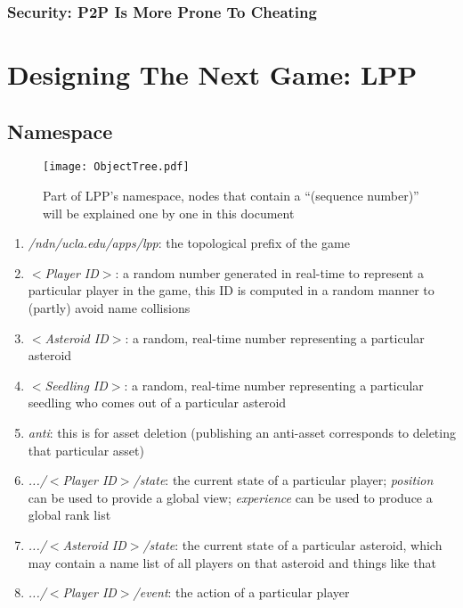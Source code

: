 \documentclass{article}
\begin{document}
\subsubsection{Security: P2P Is More Prone To Cheating}

\section{Designing The Next Game: LPP}
\label{dslpp}

\subsection{Namespace}

\begin{figure}[htbp]
\begin{center}
\texttt{[image: ObjectTree.pdf]}
\caption{Part of LPP's namespace, nodes that contain a ``(sequence number)'' will be explained one by one in this document}
\label{ns}
\end{center}
\end{figure}

\begin{enumerate}
\item \emph{/ndn/ucla.edu/apps/lpp}: the topological prefix of the game
\item \emph{$<$Player ID$>$}: a random number generated in real-time to represent a particular player in the game, this ID is computed in a random manner to (partly) avoid name collisions
\item \emph{$<$Asteroid ID$>$}: a random, real-time number representing a particular asteroid
\item \emph{$<$Seedling ID$>$}: a random, real-time number representing a particular seedling who comes out of a particular asteroid
\item \emph{anti}: this is for asset deletion (publishing an anti-asset corresponds to deleting that particular asset)
\item \emph{.../$<$Player ID$>$/state}: the current state of a particular player; \emph{position} can be used to provide a global view; \emph{experience} can be used to produce a global rank list
\item \emph{.../$<$Asteroid ID$>$/state}: the current state of a particular asteroid, which may contain a name list of all players on that asteroid and things like that
\item \emph{.../$<$Player ID$>$/event}: the action of a particular player
\end{enumerate}
\end{document}
